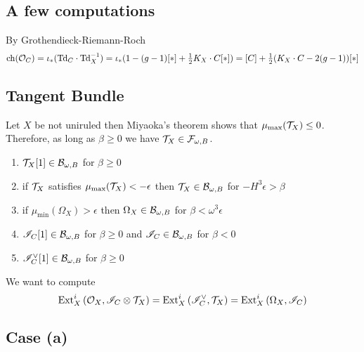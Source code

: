 \documentclass[12pt]{article}
\renewcommand{\ch}{\mathrm{ch}}
\renewcommand{\F}{\mathcal{F}}
\begin{document}
\subsection{A few computations}

\newcommand{\Td}{\mathrm{Td}}

By Grothendieck-Riemann-Roch
\[ \ch(\struct{C}) = \iota_* (\Td_C \cdot \Td_X^{-1}) = \iota_* (1 - (g-1)[*] + \tfrac{1}{2} K_X \cdot C [*]) = [C] + \tfrac{1}{2}(K_X \cdot C - 2(g-1))[*] \]

\subsection{Tangent Bundle}

Let $X$ be not uniruled then Miyaoka's theorem shows that $\mu_{\max}(\mathcal{T}_X) \le 0$. Therefore, as long as $\beta \ge 0$ we have $\T_X \in \F_{\omega,B}$.
\begin{enumerate}
\item $\mathcal{T}_X[1] \in \mathcal{B}_{\omega,B}$ for $\beta \ge 0$
\item if $\mathcal{T}_X$ satisfies $\mu_{\max}(\mathcal{T}_X) < -\epsilon$ then $\mathcal{T}_X \in \mathcal{B}_{\omega,B}$ for $- H^3 \epsilon > \beta$
\item if $\mu_{\min}(\Omega_X) > \epsilon$ then $\Omega_X \in \mathcal{B}_{\omega,B}$ for $\beta < \omega^3 \epsilon$
\item $\mathscr{I}_C[1] \in \mathcal{B}_{\omega, B}$ for $\beta \ge 0$ and $\mathscr{I}_C \in \mathcal{B}_{\omega,B}$ for $\beta < 0$
\item $\mathscr{I}_C^\vee[1] \in \mathcal{B}_{\omega,B}$ for $\beta \ge 0$
\end{enumerate}


We want to compute
\[ \mathrm{Ext}^{i}_{X} \left( \mathcal{O}_{X}, \mathscr{I}_C \otimes \mathcal{T}_X \right) = \mathrm{Ext}^{i}_{X} \left( \mathscr{I}_C^\vee, \mathcal{T}_X \right) = \mathrm{Ext}^{i}_{X} \left( \Omega_X, \mathscr{I}_C \right) \]


\subsection{Case (a)}
\end{document}
